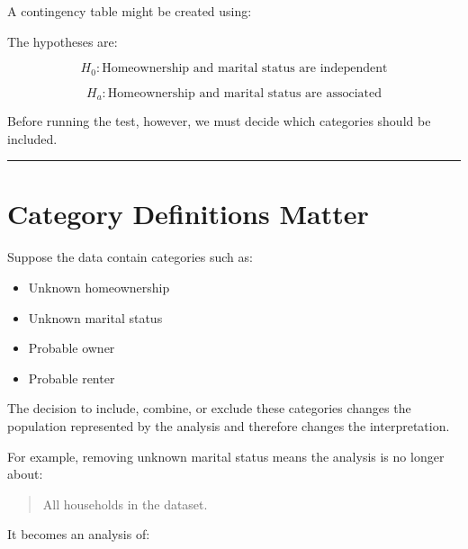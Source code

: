 \documentclass[
  letterpaper,
  DIV=11,
  numbers=noendperiod]{scrreprt}
\newenvironment{Shaded}{\begin{snugshade}}{\end{snugshade}}
\newcommand{\AttributeTok}[1]{\textcolor[rgb]{0.40,0.45,0.13}{#1}}
\newcommand{\FunctionTok}[1]{\textcolor[rgb]{0.28,0.35,0.67}{#1}}
\newcommand{\NormalTok}[1]{\textcolor[rgb]{0.00,0.23,0.31}{#1}}
\newcommand{\SpecialCharTok}[1]{\textcolor[rgb]{0.37,0.37,0.37}{#1}}
\providecommand{\tightlist}{%
  \setlength{\itemsep}{0pt}\setlength{\parskip}{0pt}}
\begin{document}
A contingency table might be created using:

\begin{Shaded}
\end{Shaded}

The hypotheses are:

\[
H_0:
\text{Homeownership and marital status are independent}
\]

\[
H_a:
\text{Homeownership and marital status are associated}
\]

Before running the test, however, we must decide which categories should
be included.

\begin{center}\rule{0.5\linewidth}{0.5pt}\end{center}


\chapter{Category Definitions Matter}\label{category-definitions-matter}

Suppose the data contain categories such as:

\begin{itemize}
\tightlist
\item
  Unknown homeownership
\item
  Unknown marital status
\item
  Probable owner
\item
  Probable renter
\end{itemize}

The decision to include, combine, or exclude these categories changes
the population represented by the analysis and therefore changes the
interpretation.

For example, removing unknown marital status means the analysis is no
longer about:

\begin{quote}
All households in the dataset.
\end{quote}

It becomes an analysis of:
\end{document}
